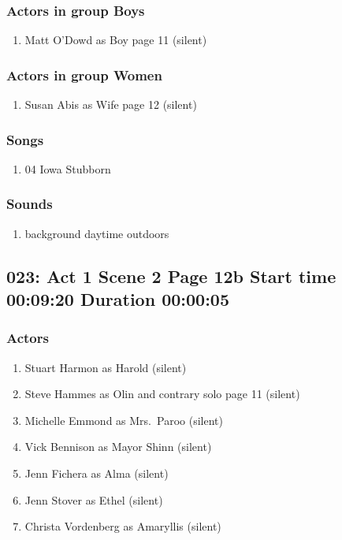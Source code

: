\subsubsection{Actors in group Boys}
\begin{enumerate}
\item Matt O'Dowd as Boy page 11 (silent)
\end{enumerate}
\subsubsection{Actors in group Women}
\begin{enumerate}
\item Susan Abis as Wife page 12 (silent)
\end{enumerate}

\subsubsection{Songs}
\begin{enumerate}
\item 04 Iowa Stubborn
\end{enumerate}\subsubsection{Sounds}
\begin{enumerate}
\item background daytime outdoors
\end{enumerate}
\subsection{023: Act 1 Scene 2 Page 12b Start time 00:09:20 Duration 00:00:05}

\subsubsection{Actors}
\begin{enumerate}
\item Stuart Harmon as Harold (silent)
\item Steve Hammes as Olin and contrary solo page 11 (silent)
\item Michelle Emmond as Mrs.~Paroo (silent)
\item Vick Bennison as Mayor Shinn (silent)
\item Jenn Fichera as Alma (silent)
\item Jenn Stover as Ethel (silent)
\item Christa Vordenberg as Amaryllis (silent)
\end{enumerate}
